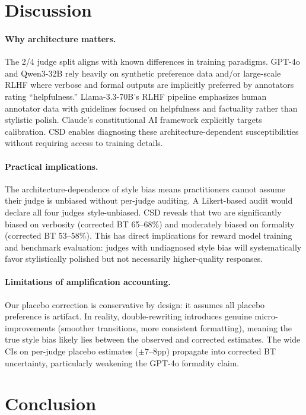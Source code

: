 \documentclass[11pt]{article}
\begin{document}
\section{Discussion}

\paragraph{Why architecture matters.} The 2/4 judge split aligns with known differences in training paradigms. GPT-4o and Qwen3-32B rely heavily on synthetic preference data and/or large-scale RLHF where verbose and formal outputs are implicitly preferred by annotators rating ``helpfulness.'' Llama-3.3-70B's RLHF pipeline emphasizes human annotator data with guidelines focused on helpfulness and factuality rather than stylistic polish. Claude's constitutional AI framework explicitly targets calibration. CSD enables diagnosing these architecture-dependent susceptibilities without requiring access to training details.

\paragraph{Practical implications.} The architecture-dependence of style bias means practitioners cannot assume their judge is unbiased without per-judge auditing. A Likert-based audit would declare all four judges style-unbiased. CSD reveals that two are significantly biased on verbosity (corrected BT 65--68\%) and moderately biased on formality (corrected BT 53--58\%). This has direct implications for reward model training and benchmark evaluation: judges with undiagnosed style bias will systematically favor stylistically polished but not necessarily higher-quality responses.

\paragraph{Limitations of amplification accounting.} Our placebo correction is conservative by design: it assumes all placebo preference is artifact. In reality, double-rewriting introduces genuine micro-improvements (smoother transitions, more consistent formatting), meaning the true style bias likely lies between the observed and corrected estimates. The wide CIs on per-judge placebo estimates ($\pm 7$--8pp) propagate into corrected BT uncertainty, particularly weakening the GPT-4o formality claim.

\section{Conclusion}
\end{document}
